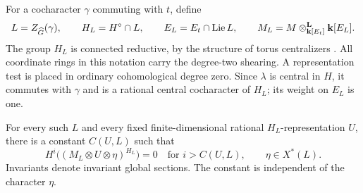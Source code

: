 For a cocharacter $\gamma$ commuting with $t$, define
\[
 L=Z_{\widehat G}(\gamma),\qquad H_L=H^\circ\cap L,
 \qquad E_L=E_t\cap\operatorname{Lie}L,
 \qquad M_L=M\otimes^{\mathbf L}_{\mathbf k[E_t]}\mathbf k[E_L].
\]
The group $H_L$ is connected reductive, by the structure of torus
centralizers \cite[Theorem~17.38 and Corollary~17.59]{MilneAlgebraicGroups}.
All coordinate rings in
this notation carry the degree-two shearing.  A representation
test is placed in ordinary cohomological degree zero.
Since $\lambda$ is central in $H$, it commutes with $\gamma$
and is a rational central cocharacter of $H_L$; its weight
on $E_L$ is one.

\begin{proposition}
\label{amp:levi}
For every such $L$ and every fixed finite-dimensional rational
$H_L$-representation $U$, there is a constant $C(U,L)$ such that
\begin{equation}
\label{amp:levi-bound}
 H^i\bigl((M_L\otimes U\otimes\eta)^{H_L}\bigr)=0
 \quad\text{for }i>C(U,L),\qquad \eta\in X^*(L).
\end{equation}
Invariants denote invariant global sections.  The constant is
independent of the character $\eta$.
\end{proposition}

